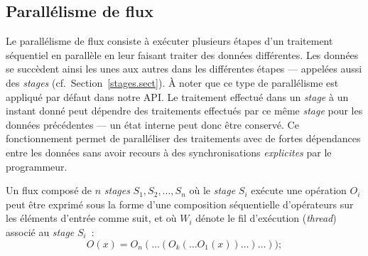 



\subsection{Parall\'elisme de flux}

Le parall\'elisme de flux consiste \`a ex\'ecuter plusieurs \'etapes d'un traitement s\'equentiel en parall\`ele en leur faisant traiter des donn\'ees diff\'erentes. Les donn\'ees se succ\`edent ainsi les unes aux autres dans les diff\'erentes \'etapes --- appel\'ees  aussi des \emph{stages} (cf.~Section~\ref{stages.sect}). \`A noter que ce type de parall\'elisme est appliqu\'e par d\'efaut dans notre API. Le traitement effectu\'e dans un \emph{stage} \`a un instant donn\'e peut d\'ependre des traitements effectu\'es par ce m\^eme \emph{stage} pour les donn\'ees pr\'ec\'edentes --- un \'etat interne peut donc \^etre conserv\'e. Ce fonctionnement permet de parall\'eliser des traitements avec de fortes d\'ependances entre les donn\'ees sans avoir recours \`a des synchronisations \emph{explicites} par le programmeur. 

\goodbreak
\begin{samepage}
Un flux compos\'e de $n$ \emph{stages} $S_1, S_2, \ldots, S_n$ o\`u le \emph{stage} $S_i$ ex\'ecute une op\'eration $O_i$ peut \^etre exprim\'e sous la forme d'une composition s\'equentielle d'op\'erateurs sur les \'el\'ements d'entr\'ee comme suit, et o\`u $W_i$ d\'enote le fil d'ex\'ecution (\emph{thread}) associ\'e au \emph{stage} $S_i$~: 
%
\[
	O(x) = O_n( \ldots (O_k( \ldots O_1(x)) \ldots ) \ldots ));
\]
\end{samepage}


